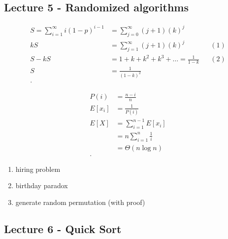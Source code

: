 \documentclass[../../main/main.tex]{subfiles}
\begin{document}
\subsection{Lecture 5 - Randomized algorithms}
\begin{exercise}
  \begin{align*}
    S= \sum^{\infty}_{i=1} i(1-p)^{i-1} &= \sum^{\infty}_{j=0} (j+1)(k)^{j}\\
    kS &=    \sum^{\infty}_{j=1} (j+1)(k)^{j} && (1)\\
    S-kS &= 1+ k + k^{2} + k^3 + \ldots = \frac{1}{1-k} && (2)\\
    S &=  \frac{1}{(1-k)^2}\\
  .\end{align*}
\end{exercise}
\begin{exercise}
  \begin{align*}
    P(i) &=  \frac{n-i}{n}\\
    E[x_i] &= \frac{1}{P(i)} \\
    E[X]&= \sum^{n-1}_{i=1}  E[x_i]  \\
    &= n \sum^{n}_{i=1} \frac{1}{i} \\
    &= \Theta(n \log n) \\
  .\end{align*}
\end{exercise}
\begin{enumerate}
  \item hiring problem
  \item birthday paradox
  \item generate random permutation (with proof)
\end{enumerate}
\subsection{Lecture 6 - Quick Sort}
\end{document}
